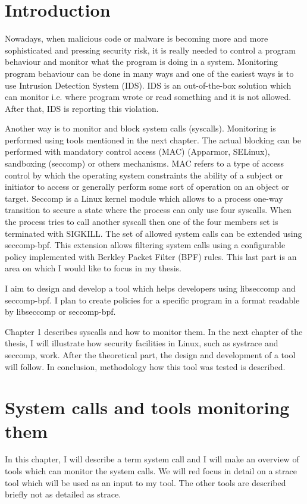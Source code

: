 
\chapter{Introduction}
Nowadays, when malicious code or malware is becoming more and more sophisticated and pressing security risk, it is really needed to control a program behaviour and monitor what the program is doing in a system.
Monitoring program behaviour can be done in many ways and one of the easiest ways is to use Intrusion Detection System (IDS).
IDS is an out-of-the-box solution which can monitor i.e. where program wrote or read something and it is not allowed.
After that, IDS is reporting this violation. %

Another way is to monitor and block system calls (syscalls).
Monitoring is performed using tools mentioned in the next chapter.
The actual blocking can be performed with mandatory control access (MAC) (Apparmor, SELinux), sandboxing (seccomp) or others mechanisms.
MAC refers to a type of access control by which the operating system constraints the ability of a subject or initiator to access or generally perform some sort of operation on an object or target.
Seccomp is a Linux kernel module which allows to a process one-way transition to secure a state where the process can only use four syscalls.
When the process tries to call another syscall then one of the four members set is terminated with SIGKILL.
The set of allowed system calls can be extended using seccomp-bpf.
This extension allows filtering system calls using a configurable policy implemented with Berkley Packet Filter (BPF) rules.
This last part is an area on which I would like to focus in my thesis.

I aim to design and develop a tool which helps developers using libseccomp and seccomp-bpf.
I plan to create policies for a specific program in a format readable by libseccomp or seccomp-bpf.

Chapter 1  describes syscalls and how to monitor them.
In the next chapter of the thesis, I will illustrate how security facilities in Linux, such as systrace and seccomp, work.
After the theoretical part, the design and development of a tool will follow.
In conclusion, methodology how this tool was tested is described.


\chapter{System calls and tools monitoring them}
In this chapter, I will describe a term system call and I will make an overview of tools which can monitor the system calls.
We will red focus in detail on a strace tool which will be used as an input to my tool.
The other tools are described briefly not as detailed as strace.

